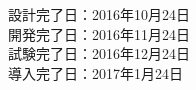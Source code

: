 \hspace{5mm}
\begin{minipage}[t]{145mm}
設計完了日：2016年10月24日\\
開発完了日：2016年11月24日\\
試験完了日：2016年12月24日\\
導入完了日：2017年1月24日
\end{minipage}
